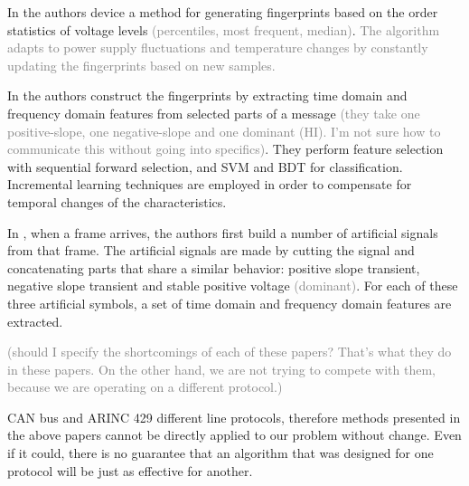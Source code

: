 \documentclass[conference]{IEEEtran}
\begin{document}
  In \cite{cho2017viden} the authors device a method for generating fingerprints based on the order statistics of voltage levels \textcolor{gray}{(percentiles, most frequent, median)}. \textcolor{gray}{The algorithm adapts to power supply fluctuations and temperature changes by constantly updating the fingerprints based on new samples.}
  
  In \cite{choi2018voltageids} the authors construct the fingerprints by extracting time domain and frequency domain features from selected parts of a message \textcolor{gray}{(they take one positive-slope, one negative-slope and one dominant (HI). I'm not sure how to communicate this without going into specifics)}. They perform feature selection with sequential forward selection, and SVM and BDT for classification. Incremental learning techniques \cite{diehl2003svm} are employed in order to compensate for temporal changes of the characteristics.
  
  In \cite{kneib2018scission}, when a frame arrives, the authors first build a number of artificial signals from that frame. The artificial signals are made by cutting the signal and concatenating parts that share a similar behavior: positive slope transient, negative slope transient and stable positive voltage \textcolor{gray}{(dominant)}. For each of these three artificial symbols, a set of time domain and frequency domain features are extracted.
  
  \textcolor{gray}{(should I specify the shortcomings of each of these papers? That's what they do in these papers. On the other hand, we are not trying to compete with them, because we are operating on a different protocol.)}
  
  CAN bus and ARINC 429 different line protocols, therefore methods presented in the above papers cannot be directly applied to our problem without change. Even if it could, there is no guarantee that an algorithm that was designed for one protocol will be just as effective for another.
  
\end{document}
